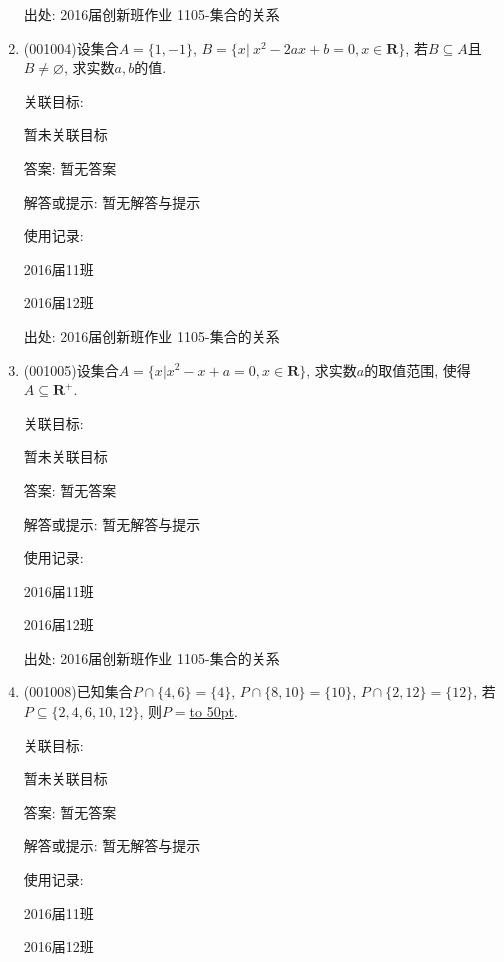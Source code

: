 \documentclass[10pt,a4paper]{article}
\newcommand{\blank}[1]{\underline{\hbox to #1pt{}}}
\begin{document}
\begin{enumerate}[1.]
出处: 2016届创新班作业	1105-集合的关系
\item { (001004)}设集合$A=\{1,-1\}$, $B=\{x|\ x^2-2ax+b=0,x\in\mathbf{R}\}$, 若$B\subseteq A$且$B\neq\varnothing$, 求实数$a,b$的值.


关联目标:

暂未关联目标

答案: 暂无答案

解答或提示: 暂无解答与提示

使用记录:

2016届11班	

2016届12班	


出处: 2016届创新班作业	1105-集合的关系
\item { (001005)}设集合$A=\{x|x^2-x+a=0, x \in \mathbf{R}\}$, 求实数$a$的取值范围, 使得$A \subseteq \mathbf{R}^+$.


关联目标:

暂未关联目标

答案: 暂无答案

解答或提示: 暂无解答与提示

使用记录:

2016届11班	

2016届12班	


出处: 2016届创新班作业	1105-集合的关系
\item { (001008)}已知集合$P\cap\{4,6\}=\{4\}$, $P\cap\{8,10\}=\{10\}$, $P\cap\{2,12\}=\{12\}$,
若$P\subseteq\{2,4,6,10,12\}$, 则$P=$\blank{50}.


关联目标:

暂未关联目标

答案: 暂无答案

解答或提示: 暂无解答与提示

使用记录:

2016届11班	

2016届12班	



\end{enumerate}
\end{document}
